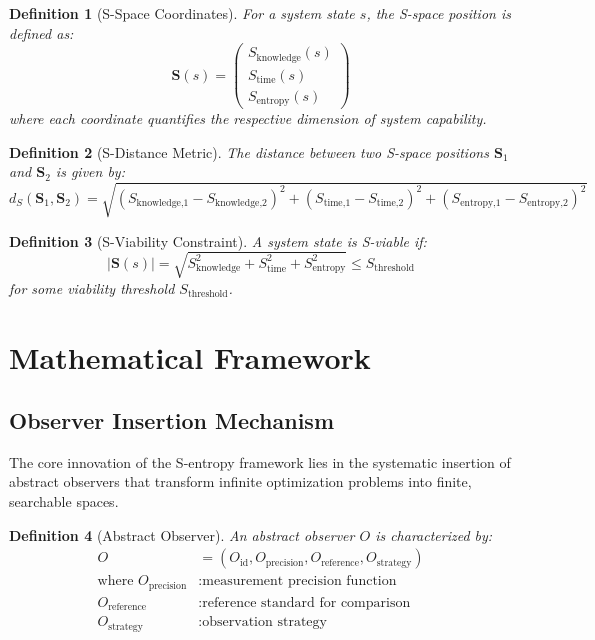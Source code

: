 \documentclass[12pt,a4paper]{article}
\newtheorem{definition}{Definition}
\begin{document}
\begin{definition}[S-Space Coordinates]
For a system state $s$, the S-space position is defined as:
\begin{equation}
\mathbf{S}(s) = \begin{pmatrix} S_{\text{knowledge}}(s) \\ S_{\text{time}}(s) \\ S_{\text{entropy}}(s) \end{pmatrix}
\end{equation}
where each coordinate quantifies the respective dimension of system capability.
\end{definition}

\begin{definition}[S-Distance Metric]
The distance between two S-space positions $\mathbf{S}_1$ and $\mathbf{S}_2$ is given by:
\begin{equation}
d_S(\mathbf{S}_1, \mathbf{S}_2) = \sqrt{(S_{\text{knowledge,1}} - S_{\text{knowledge,2}})^2 + (S_{\text{time,1}} - S_{\text{time,2}})^2 + (S_{\text{entropy,1}} - S_{\text{entropy,2}})^2}
\end{equation}
\end{definition}

\begin{definition}[S-Viability Constraint]
A system state is S-viable if:
\begin{equation}
|\mathbf{S}(s)| = \sqrt{S_{\text{knowledge}}^2 + S_{\text{time}}^2 + S_{\text{entropy}}^2} \leq S_{\text{threshold}}
\end{equation}
for some viability threshold $S_{\text{threshold}}$.
\end{definition}

\section{Mathematical Framework}

\subsection{Observer Insertion Mechanism}

The core innovation of the S-entropy framework lies in the systematic insertion of abstract observers that transform infinite optimization problems into finite, searchable spaces.

\begin{definition}[Abstract Observer]
An abstract observer $O$ is characterized by:
\begin{align}
O &= (O_{\text{id}}, O_{\text{precision}}, O_{\text{reference}}, O_{\text{strategy}}) \\
\text{where } O_{\text{precision}} &: \text{measurement precision function} \\
O_{\text{reference}} &: \text{reference standard for comparison} \\
O_{\text{strategy}} &: \text{observation strategy}
\end{align}
\end{definition}
\end{document}
